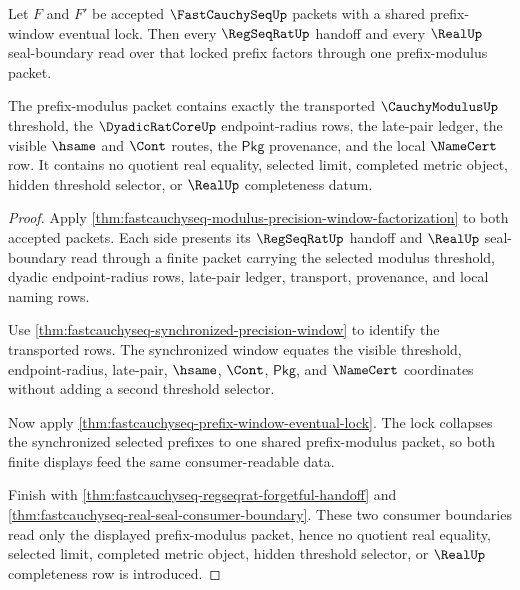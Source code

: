\begin{theorem}
\label{thm:fastcauchyseq-prefix-modulus-real-seal-factorization}
Let $F$ and $F'$ be accepted $\FastCauchySeqUp$ packets with a shared
prefix-window eventual lock. Then every $\RegSeqRatUp$ handoff and every
$\RealUp$ seal-boundary read over that locked prefix factors through one
prefix-modulus packet.

The prefix-modulus packet contains exactly the transported
$\CauchyModulusUp$ threshold, the $\DyadicRatCoreUp$ endpoint-radius rows, the
late-pair ledger, the visible $\hsame$ and $\Cont$ routes, the
$\mathsf{Pkg}$ provenance, and the local $\NameCert$ row. It contains no
quotient real equality, selected limit, completed metric object, hidden
threshold selector, or $\RealUp$ completeness datum.
\end{theorem}
\begin{proof}
Apply
\autoref{thm:fastcauchyseq-modulus-precision-window-factorization} to both
accepted packets. Each side presents its $\RegSeqRatUp$ handoff and $\RealUp$
seal-boundary read through a finite packet carrying the selected modulus
threshold, dyadic endpoint-radius rows, late-pair ledger, transport,
provenance, and local naming rows.

Use \autoref{thm:fastcauchyseq-synchronized-precision-window} to identify the
transported rows. The synchronized window equates the visible threshold,
endpoint-radius, late-pair, $\hsame$, $\Cont$, $\mathsf{Pkg}$, and
$\NameCert$ coordinates without adding a second threshold selector.

Now apply \autoref{thm:fastcauchyseq-prefix-window-eventual-lock}. The lock
collapses the synchronized selected prefixes to one shared prefix-modulus
packet, so both finite displays feed the same consumer-readable data.

Finish with \autoref{thm:fastcauchyseq-regseqrat-forgetful-handoff} and
\autoref{thm:fastcauchyseq-real-seal-consumer-boundary}. These two consumer
boundaries read only the displayed prefix-modulus packet, hence no quotient
real equality, selected limit, completed metric object, hidden threshold
selector, or $\RealUp$ completeness row is introduced.
\end{proof}

